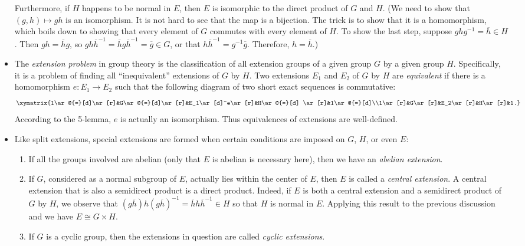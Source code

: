 \documentclass[12pt]{article}
\begin{document}
\begin{itemize}
Furthermore, if $H$ happens to be normal in $E$, then $E$ is isomorphic to the direct product of $G$ and $H$.  (We need to show that $(g,h)\mapsto gh$ is an isomorphism.  It is not hard to see that the map is a bijection.  The trick is to show that it is a homomorphism, which boils down to showing that every element of $G$ commutes with every element of $H$.  To show the last step, suppose $ghg^{-1}=\overline{h}\in H$.  Then $gh=\overline{h}g$, so $gh\overline{h}^{-1}=\overline{h}g\overline{h}^{-1}= \overline{g}\in G$, or that $h\overline{h}^{-1}=g^{-1}\overline{g}$.  Therefore, $h=\overline{h}$.)
\item The \emph{extension problem} in group theory is the
classification of all extension groups of a given group $G$ by a
given group $H$.  Specifically, it is a problem of finding all
``inequivalent'' extensions of $G$ by $H$.  Two extensions $E_1$ and
$E_2$ of $G$ by $H$ are \emph{equivalent} if there is a homomorphism
$e\colon E_1\to E_2$ such that the following diagram of two short exact
sequences is commutative:
$$\xymatrix{1\ar@{=}[d]\ar[r]&G\ar@{=}[d]\ar[r]&E_1\ar[d]^e\ar[r]&H\ar@{=}[d]
\ar[r]&1\ar@{=}[d]\\1\ar[r]&G\ar[r]&E_2\ar[r]&H\ar[r]&1.}$$
According to the 5-lemma, $e$ is actually an isomorphism.  Thus equivalences
of extensions are well-defined.
\item Like split extensions, special extensions are formed when
certain conditions are imposed on $G$, $H$, or even $E$:
\begin{enumerate}
\item If all the groups involved are abelian (only that $E$ is abelian is
necessary here), then we have an \emph{abelian extension}.
\item If $G$, considered as a normal subgroup of $E$, actually lies within
the center of $E$, then $E$ is called a \emph{central extension}.  A central extension that is also a semidirect product is a direct product.  Indeed, if $E$ is both a central extension and a semidirect product of $G$ by $H$, we observe that $(g\overline{h})h(g\overline{h})^{-1}=\overline{h}h\overline{h}^{-1}\in H$ so that $H$ is normal in $E$.  Applying this result to the previous discussion and we have $E\cong G\times H$.
\item If $G$ is a cyclic group, then the extensions in question are
called \emph{cyclic extensions}.
\end{enumerate}
\end{itemize}
\end{document}
